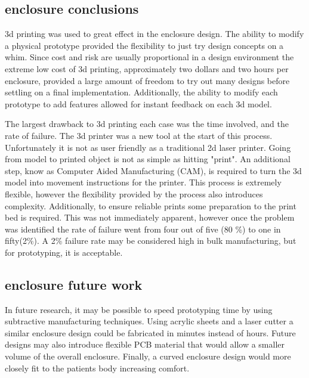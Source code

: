 \subsection{enclosure conclusions}
3d printing was used to great effect in the enclosure design. The ability to modify a physical prototype provided the flexibility to just try design concepts on a whim. Since cost and risk are usually proportional in a design environment the extreme low cost of 3d printing, approximately two dollars and two hours per enclosure, provided a large amount of freedom to try out many designs before settling on a final implementation. Additionally, the ability to modify each prototype to add features allowed for instant feedback on each 3d model. 

The largest drawback to 3d printing each case was the time involved, and the rate of failure. The 3d printer was a new tool at the start of this process. Unfortunately it is not as user friendly as a traditional 2d laser printer. Going from model to printed object is not as simple as hitting "print". An additional step, know as Computer Aided Manufacturing (CAM), is required to turn the 3d model into movement instructions for the printer. This process is extremely flexible, however the flexibility provided by the process also introduces complexity. Additionally, to ensure reliable prints some preparation to the print bed is required. This was not immediately apparent, however once the problem was identified the rate of failure went from four out of five (80 \%) to one in fifty(2\%). A 2\% failure rate may be considered high in bulk manufacturing, but for prototyping, it is acceptable.

\subsection{enclosure future work}
In future research, it may be possible to speed prototyping time by using subtractive manufacturing techniques. Using acrylic sheets and a laser cutter a similar enclosure design could be fabricated in minutes instead of hours. Future designs may also introduce flexible PCB material that would allow a smaller volume of the overall enclosure. Finally, a curved enclosure design would more closely fit to the patients body increasing comfort.
